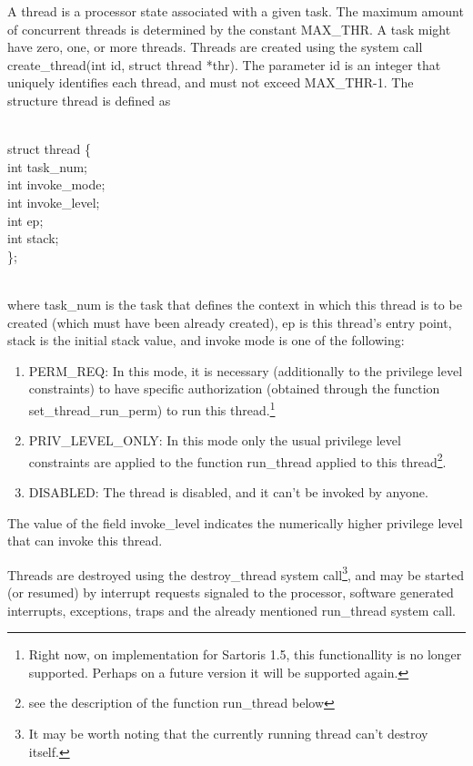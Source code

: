 \documentclass[11pt, letterpaper, twoside, english]{book}
\begin{document}
A thread is a processor state associated with a given task. The maximum amount of concurrent threads is determined by the constant \textsf{MAX\_THR}. A task might have zero, one, or more threads. Threads are created using the system call \textsf{create\_thread(int id, struct thread *thr)}. The parameter \textsf{id} is an integer that uniquely identifies each thread, and must not exceed \textsf{MAX\_THR}-1. The structure \textsf{thread} is defined as \\
\\
\begin{sf} \noindent struct thread \{ \\
\indent  int task\_num; \\
\indent  int invoke\_mode; \\
\indent  int invoke\_level; \\
\indent  int ep; \\
\indent  int stack; \\
\}; \\
\end{sf}
\\
where \textsf{task\_num} is the task that defines the context in which this thread is to be created (which must have been already created), \textsf{ep} is this thread's entry point, \textsf{stack} is the initial stack value, and invoke mode is one of the following:
\begin{enumerate}
\item[] \textsf{PERM\_REQ}: In this mode, it is necessary (additionally to the privilege level constraints) to have specific authorization (obtained through the function \textsf{set\_thread\_run\_perm}) to run this thread.\footnote{Right now, on implementation for Sartoris 1.5, this functionallity is no longer supported. Perhaps on a future version it will be supported again.}
\item[] \textsf{PRIV\_LEVEL\_ONLY}: In this mode only the usual privilege level constraints are applied to the function \textsf{run\_thread} applied to this thread\footnote{see the description of the function \textsf{run\_thread} below}.
\item[] \textsf{DISABLED}: The thread is disabled, and it can't be invoked by anyone.
\end{enumerate}
The value of the field \textsf{invoke\_level} indicates the numerically higher privilege level that can invoke this thread. 


Threads are destroyed using the \textsf{destroy\_thread} system call\footnote{It may be worth noting that the currently running thread can't destroy itself.}, and may be started (or resumed) by interrupt requests signaled to the processor, software generated interrupts, exceptions, traps and the already mentioned \textsf{run\_thread} system call.
\end{document}
